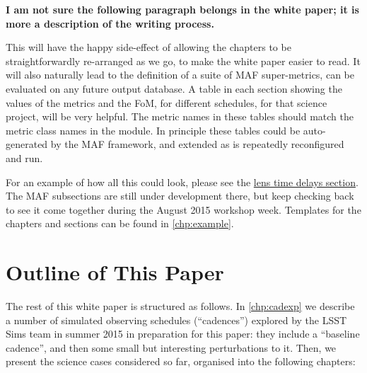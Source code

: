 {\bf I am not sure the following paragraph belongs in the white paper;
  it is more a description of the writing process.}

This will have the happy side-effect of allowing the chapters to be
straightforwardly re-arranged as we go, to make the white paper easier
to read. It will also naturally lead to the definition of a suite of
MAF  super-metrics, can be evaluated on any future \OpSim output
database.  A table in each section showing the values of the metrics
and the FoM, for different schedules, for that science project, will
be very helpful. The metric names in these tables should match the
metric class names in the
\href{https://github.com/LSST-nonproject/sims_maf_contrib/wiki}{\simsMafContrib}
module. In principle these tables could be auto-generated by the MAF
framework, and extended as \OpSim is repeatedly reconfigured and run.

For an example of how all this could look, please see the
\hyperref[sec:lenstimedelays]{lens
time delays section}. The MAF subsections are still under development
there, but keep checking back to see it come together during the
August 2015 workshop week. Templates for the chapters and sections can
be found in \autoref{chp:example}.

\navigationbar


\section{Outline of This Paper}
\def\secname{intro:outline}\label{sec:\secname}

The rest of this white paper is structured as follows. In
\autoref{chp:cadexp} we describe a number of \OpSim simulated observing
schedules (``cadences'') explored by the LSST Sims team in summer 2015
in preparation for this paper: they include a ``baseline cadence'', and
then some small but interesting perturbations to it. Then, we present
the science cases considered so far, organised into the following
chapters:

